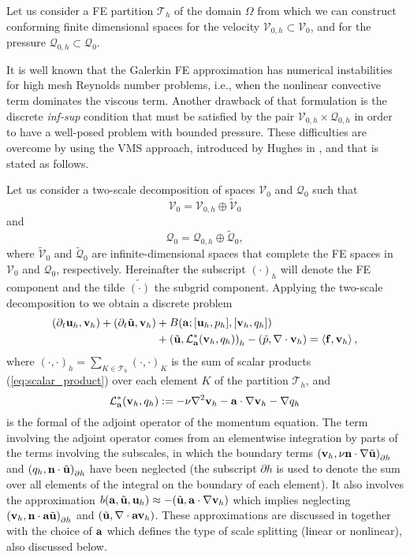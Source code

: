 Let us consider a FE partition $\mathcal{T}_h$ of the domain $\Omega$ from which we can construct conforming finite dimensional spaces for the velocity $\mathcal{V}_{0,h} \subset \mathcal{V}_0$, and for the pressure $\mathcal{Q}_{0,h}\subset \mathcal{Q}_0$. 

It is well known that the Galerkin FE approximation  has numerical instabilities for high mesh Reynolds number problems, i.e., when the nonlinear convective term dominates the viscous term. Another drawback of that formulation is the discrete \textit{inf-sup} condition that must be satisfied by the pair $\mathcal{V}_{0,h} \times\mathcal{Q}_{0,h}$ in order to have a well-posed problem with bounded pressure. These difficulties are overcome by using the VMS approach, introduced by Hughes in \cite{hughes,hughes}, and that is stated as follows.

Let us consider a two-scale decomposition of spaces $\mathcal{V}_0$ and $\mathcal{Q}_0$ such that $$\mathcal{V}_0=\mathcal{V}_{0,h}\oplus\widetilde{\mathcal{V}}_0$$ and $$\mathcal{Q}_0=\mathcal{Q}_{0,h}\oplus\widetilde{\mathcal{Q}}_0,$$ where $\widetilde{\mathcal{V}}_0$ and $\widetilde{\mathcal{Q}}_0$ are infinite-dimensional spaces that complete the FE spaces in $\mathcal{V}_0$ and $\mathcal{Q}_0$, respectively. Hereinafter the subscript $(\cdot)_h$ will denote the FE component and the tilde $\widetilde{(\cdot)}$ the subgrid component. Applying the two-scale decomposition to  we obtain a discrete problem
\begin{align}
\label{eq-NS_discrete}
(\partial_t{\bf u}_h,{\bf v}_h)+(\partial_t\tilde{{\bf u}},{\bf v}_h)&+B({\bf a};[{\bf u}_h,p_h],[{\bf v}_h,q_h])\\\nonumber
&+\left(\tilde{{\bf u}},\mathcal{L}_{{\bf a}}^*({\bf v}_h,q_h)\right)_h-\left(\tilde{p},\nabla\cdot{\bf v}_h\right)=\left<{\bf f},{\bf v}_h\right>,
\end{align}
where $(\cdot,\cdot)_h=\sum_{K\in\mathcal{T}_h}(\cdot,\cdot)_K$ is the sum of scalar products (\ref{eq:scalar_product}) over each element $K$ of the partition $\mathcal{T}_h$, and
\begin{equation}
\label{eq-adjoint}
\mathcal{L}_{{\bf a}}^*({\bf v}_h,q_h):=-\nu\nabla^2{\bf v}_h-{\bf a}\cdot\nabla{\bf v}_h-\nabla q_h
\end{equation}
is the formal of the adjoint operator of the momentum equation. The term involving the adjoint operator comes from an elementwise integration by parts of the terms involving the subscales, in which the boundary terms 
$\left( {\bf v}_{h},\nu {\bf n}\cdot \nabla \tilde{{\bf u}}\right)_{\partial h}$ and
$\left( q_{h},{\bf n}\cdot \tilde{{\bf u}}\right)_{\partial h}$
have been neglected (the subscript ${\partial h}$ is used to denote the sum over all elements of the integral on the boundary of each element). It also involves the approximation 
$b({\bf a},\tilde{{\bf u}},{\bf u}_h) \approx -(\tilde{{\bf u}},{\bf a}\cdot\nabla{\bf v}_h)$
which implies neglecting 
$\left( {\bf v}_{h},{\bf n}\cdot {\bf a} \tilde{{\bf u}}\right)_{\partial h}$ and
$(\tilde{{\bf u}},\nabla\cdot{\bf a}{\bf v}_h)$. 
These approximations are discussed in  \cite{codina_time_2007} together with the choice of ${\bf a}$ which defines the type of scale splitting (linear or nonlinear), also discussed below.

